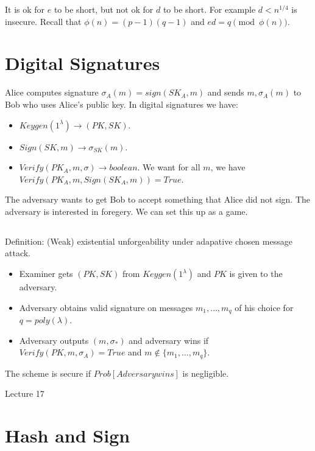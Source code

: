 \documentclass[psamsfonts]{amsart}
\begin{document}
It is ok for $e$ to be short, but not ok for $d$ to be short. For example $d < n^{1/4}$ is insecure. Recall that $\phi(n) = (p-1)(q-1)$ and $ed = q \pmod{\phi(n)}$.

\section{Digital Signatures}

Alice computes signature $\sigma_A(m) = sign(SK_A, m)$ and sends $m, \sigma_A(m)$ to Bob who uses Alice's public key. In digital signatures we have:
\begin{itemize}
  \item $Keygen(1^{\lambda}) \to (PK, SK)$.
  \item $Sign(SK, m) \to \sigma_{SK}(m)$.
  \item $Verify(PK_A, m, \sigma) \to boolean$. We want for all $m$, we have $Verify(PK_A, m, Sign(SK_A, m)) = True$.
\end{itemize}

The adversary wants to get Bob to accept something that Alice did not sign. The adversary is interested in foregery. We can set this up as a game.

\subsection{}

Definition: (Weak) existential unforgeability under adapative chosen message attack.

\begin{itemize}
  \item Examiner gets $(PK, SK)$ from $Keygen(1^\lambda)$ and $PK$ is given to the adversary.
  \item Adversary obtains valid signature on messages $m_1, \ldots, m_q$ of his choice for $q = poly(\lambda)$.
  \item Adversary outputs $(m, \sigma_{*})$ and adversary wins if $Verify(PK,m,\sigma_A) = True$ and $m \not \in \{m_1, \ldots, m_q \}$.
\end{itemize}

The scheme is secure if $Prob[Adversary wins]$ is negligible.

\newpage
\Large{Lecture 17}


\maketitle

\section{Hash and Sign}
\end{document}

